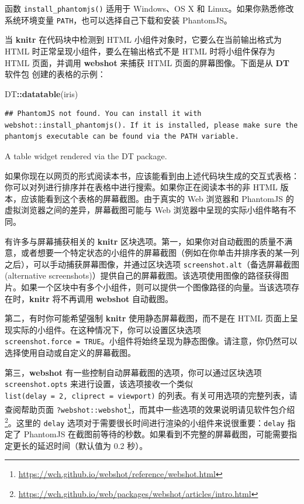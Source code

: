 \documentclass[
  12pt,
]{krantz}
\newenvironment{Shaded}{\begin{snugshade}}{\end{snugshade}}
\newcommand{\FunctionTok}[1]{\textcolor[rgb]{0.13,0.29,0.53}{\textbf{#1}}}
\newcommand{\NormalTok}[1]{#1}
\newcommand{\SpecialCharTok}[1]{\textcolor[rgb]{0.81,0.36,0.00}{\textbf{#1}}}
\renewcommand{\href}[2]{#2\footnote{\url{#1}}}
\theoremstyle{definition}
\theoremstyle{definition}
\theoremstyle{definition}
\theoremstyle{definition}
\theoremstyle{remark}
\begin{document}
函数 \texttt{install\_phantomjs()} 适用于 Windows、OS X 和 Linux。如果你熟悉修改系统环境变量 \texttt{PATH}，也可以选择自己下载和安装 PhantomJS。

当 \textbf{knitr} 在代码块中检测到 HTML 小组件对象时，它要么在当前输出格式为 HTML 时正常呈现小组件，要么在输出格式不是 HTML 时将小组件保存为 HTML 页面，并调用 \textbf{webshot} 来捕获 HTML 页面的屏幕图像。下面是从 \textbf{DT} 软件包 \citep{R-DT} 创建的表格的示例：

\begin{Shaded}
\begin{Highlighting}[]
\NormalTok{DT}\SpecialCharTok{::}\FunctionTok{datatable}\NormalTok{(iris)}
\end{Highlighting}
\end{Shaded}

\begin{verbatim}
## PhantomJS not found. You can install it with webshot::install_phantomjs(). If it is installed, please make sure the phantomjs executable can be found via the PATH variable.
\end{verbatim}

\label{fig:DT-demo}A table widget rendered via the DT package.

如果你现在以网页的形式阅读本书，应该能看到由上述代码块生成的交互式表格：你可以对列进行排序并在表格中进行搜索。如果你正在阅读本书的非 HTML 版本，应该能看到这个表格的屏幕截图。由于真实的 Web 浏览器和 PhantomJS 的虚拟浏览器之间的差异，屏幕截图可能与 Web 浏览器中呈现的实际小组件略有不同。

有许多与屏幕捕获相关的 \textbf{knitr} 区块选项。第一，如果你对自动截图的质量不满意，或者想要一个特定状态的小组件的屏幕截图（例如在你单击并排序表的某一列之后），可以手动捕获屏幕图像，并通过区块选项 \texttt{screenshot.alt}（备选屏幕截图 (alternative screenshots)）提供自己的屏幕截图。该选项使用图像的路径获得图片。如果一个区块中有多个小组件，则可以提供一个图像路径的向量。当该选项存在时，\textbf{knitr} 将不再调用 \textbf{webshot} 自动截图。

第二，有时你可能希望强制 \textbf{knitr} 使用静态屏幕截图，而不是在 HTML 页面上呈现实际的小组件。在这种情况下，你可以设置区块选项 \texttt{screenshot.force\ =\ TRUE}。小组件将始终呈现为静态图像。请注意，你仍然可以选择使用自动或自定义的屏幕截图。

第三，\textbf{webshot} 有一些控制自动屏幕截图的选项，你可以通过区块选项 \texttt{screenshot.opts} 来进行设置，该选项接收一个类似 \texttt{list(delay\ =\ 2,\ cliprect\ =\ \textquotesingle{}viewport\textquotesingle{})} 的列表。有关可用选项的完整列表，请查阅帮助页面 \href{https://wch.github.io/webshot/reference/webshot.html}{\texttt{?webshot::webshot}}，而其中一些选项的效果说明请见\href{https://wch.github.io/web/packages/webshot/articles/intro.html}{软件包介绍}。这里的 \texttt{delay} 选项对于需要很长时间进行渲染的小组件来说很重要：\texttt{delay} 指定了 PhantomJS 在截图前等待的秒数。如果看到不完整的屏幕截图，可能需要指定更长的延迟时间（默认值为 0.2 秒）。
\end{document}
